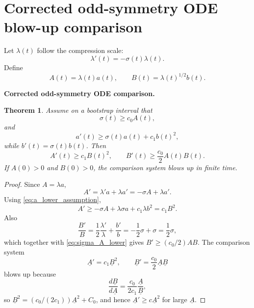 \documentclass[11pt]{amsart}
\newtheorem{theorem}{Theorem}[section]
\begin{document}
\section{Corrected odd-symmetry ODE blow-up comparison}

Let \(\lambda(t)\) follow the compression scale:
\begin{equation}\label{eq:lambda_scale}
\lambda'(t)=-\sigma(t)\lambda(t).
\end{equation}
Define
\begin{equation}\label{eq:A_B_def}
A(t)=\lambda(t)a(t),
\qquad
B(t)=\lambda(t)^{1/2}b(t).
\end{equation}

\medskip
\noindent\textbf{Corrected odd-symmetry ODE comparison.}
\begin{theorem}\label{thm:ODE_comparison}
Assume on a bootstrap interval that
\begin{equation}\label{eq:sigma_A_lower}
\sigma(t)\ge c_0A(t),
\end{equation}
and
\begin{equation}\label{eq:a_lower_assumption}
a'(t)\ge \sigma(t)a(t)+c_1b(t)^2,
\end{equation}
while \(b'(t)=\sigma(t)b(t)\).  Then
\begin{equation}\label{eq:A_B_ineq}
A'(t)\ge c_1B(t)^2,
\qquad
B'(t)\ge \frac{c_0}{2}A(t)B(t).
\end{equation}
If \(A(0)>0\) and \(B(0)>0\), the comparison system blows up in finite time.
\end{theorem}

\begin{proof}
Since \(A=\lambda a\),
\[
A'=\lambda'a+\lambda a'=-\sigma A+\lambda a'.
\]
Using \eqref{eq:a_lower_assumption},
\[
A'\ge -\sigma A+\lambda\sigma a+c_1\lambda b^2=c_1B^2.
\]
Also
\[
\frac{B'}{B}=\frac12\frac{\lambda'}{\lambda}+\frac{b'}b=-\frac12\sigma+\sigma=\frac12\sigma,
\]
which together with \eqref{eq:sigma_A_lower} gives \(B'\ge(c_0/2)AB\).  The comparison system
\[
\underline A'=c_1\underline B^2,
\qquad
\underline B'=\frac{c_0}{2}\underline A\underline B
\]
blows up because
\[
\frac{d\underline B}{d\underline A}
=\frac{c_0}{2c_1}\frac{\underline A}{\underline B},
\]
so \(\underline B^2=(c_0/(2c_1))\underline A^2+C_0\), and hence \(\underline A'\ge c\underline A^2\) for large \(\underline A\).
\end{proof}
\end{document}
